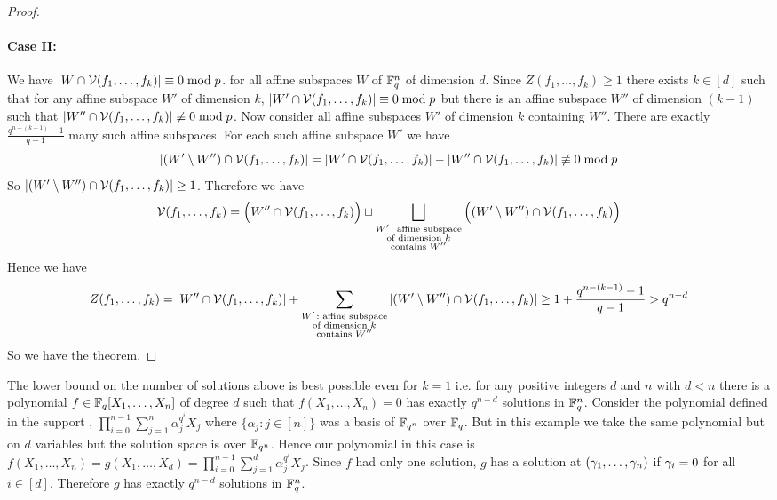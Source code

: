 \begin{proof}
  \paragraph*{Case II:} We have $|W\cap\mathcal{V}(f_1,\dots,f_k)|\equiv 0\bmod p$. for all affine subspaces $W$ of $\mathbb{F}_q^n$ of dimension $d$. Since $Z(f_1,\dots,f_k)\geq 1$ there exists $ k\in[d]$ such that for any affine subspace $W'$ of dimension $k$, $|W'\cap \mathcal{V}(f_1,\dots,f_k)|\equiv 0\bmod p$ but there is an affine subspace $W''$ of dimension $(k-1)$ such that $|W''\cap \mathcal{V}(f_1,\dots, f_k)|\not\equiv 0\bmod p$. Now consider all affine subspaces $W'$ of dimension $k$ containing $W''$. There are exactly $\frac{q^{n-(k-1)}-1}{q-1}$ many such affine subspaces. For each such affine subspace $W'$ we have $$|(W'\setminus W'')\cap \mathcal{V}(f_1,\dots,f_k)|=|W'\cap \mathcal{V}(f_1,\dots,f_k)|-|W''\cap \mathcal{V}(f_1,\dots,f_k)|\not\equiv0\bmod p$$So $|(W'\setminus W'')\cap \mathcal{V}(f_1,\dots,f_k)|\geq 1$. Therefore we have $$\mathcal{V}(f_1,\dots, f_k)=\Big(W''\cap \mathcal{V}(f_1,\dots,f_k)\Big)\sqcup\bigsqcup_{\substack{W'\colon \text{affine subspace}\\ \text{of dimension $k$}\\ \text{contains $W''$}}}\Big((W'\setminus W'')\cap \mathcal{V}(f_1,\dots,f_k)\Big)$$Hence we have $$Z(f_1,\dots, f_k)=|W''\cap \mathcal{V}(f_1,\dots,f_k)|+\sum_{\substack{W'\colon \text{affine subspace}\\ \text{of dimension $k$}\\ \text{contains $W''$}}}|(W'\setminus W'')\cap \mathcal{V}(f_1,\dots,f_k)|\geq 1+\frac{q^{n-(k-1)}-1}{q-1}>q^{n-d}$$So we have the theorem. 
\end{proof}

The lower bound on the number of solutions above is best possible even for $k=1$ i.e. for any positive integers $d$ and $n$ with $d<n$ there is a polynomial $f\in\mathbb{F}_q[X_1,\dots, X_n]$ of degree $d$ such that $f(X_1,\dots, X_n)=0$ has exactly $q^{n-d}$ solutions in $\mathbb{F}_q^n$. Consider the polynomial defined in the support \CWthm, $\prod_{i=0}^{n-1}\sum_{j=1}^n\alpha_j^{q^i}X_j$ where $\{\alpha_j\colon j\in[n]\}$ was a basis of $\mathbb{F}_{q^n}$ over $\mathbb{F}_q$. But in this example we take the same polynomial but on $d$ variables but the solution space is over $\mathbb{F}_{q^n}$. Hence our polynomial in this case is $f(X_1,\dots,X_n)=g(X_1,\dots,X_d)=\prod_{i=0}^{n-1}\sum_{j=1}^d\alpha_j^{q^i}X_j$. Since $f$ had only one solution, $g$ has a solution at $(\gamma_1,\dots,\gamma_n)$ if $\gamma_i=0$ for all $i\in[d]$. Therefore $g$ has exactly $q^{n-d}$ solutions in $\mathbb{F}_q^n$. 

